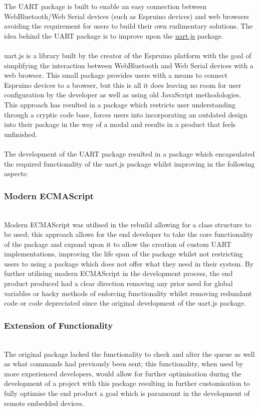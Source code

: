 \documentclass{l4proj}
\begin{document}
The UART package is built to enable an easy connection between WebBluetooth/Web Serial devices (such as Espruino devices) and web browsers avoiding the requirement for users to build their own rudimentary solutions. The idea behind the UART package is to improve upon the \href{https://www.espruino.com/UART.js}{uart.js} package. 
\\ \\
uart.js is a library built by the creator of the Espruino platform with the goal of simplifying the interaction between WebBluetooth and Web Serial devices with a web browser. This small package provides users with a means to connect Espruino devices to a browser, but this is all it does leaving no room for user configuration by the developer as well as using old JavaScript methodologies. This approach has resulted in a package which restricts user understanding through a cryptic code base, forces users into incorporating an outdated design into their package in the way of a modal and results in a product that feels unfinished.
\\ \\
The development of the UART package resulted in a package which encapsulated the required functionality of the uart.js package whilst improving in the following aspects: 
\\  
\subsubsection{Modern ECMAScript}\hfill\\
Modern ECMAScript was utilised in the rebuild allowing for a class structure to be used; this approach allows for the end developer to take the core functionality of the package and expand upon it to allow the creation of custom UART implementations, improving the life span of the package whilst not restricting users to using a package which does not offer what they need in their system. By further utilising modern ECMAScript in the development process, the end product produced had a clear direction removing any prior need for global variables or hacky methods of enforcing functionality whilst removing redundant code or code depreciated since the original development of the uart.js package.
\\
\subsubsection{Extension of Functionality}\hfill\\
The original package lacked the functionality to check and alter the queue as well as what commands had previously been sent; this functionality, when used by more experienced developers, would allow for further optimisation during the development of a project with this package resulting in further customisation to fully optimise the end product a goal which is paramount in the development of remote embedded devices.
\\ 
\end{document}
